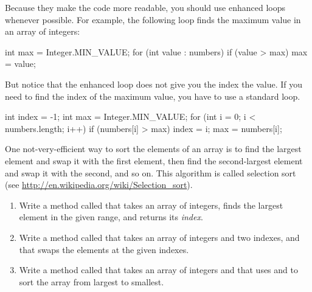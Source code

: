 
Because they make the code more readable, you should use enhanced  loops whenever possible.
For example, the following loop finds the maximum value in an array of integers:

\begin{code}
int max = Integer.MIN_VALUE;
for (int value : numbers) {
    if (value > max) {
        max = value;
    }
}
\end{code}

But notice that the enhanced  loop does not give you the index the value.
If you need to find the index of the maximum value, you have to use a standard  loop.

\begin{code}
int index = -1;
int max = Integer.MIN_VALUE;
for (int i = 0; i < numbers.length; i++) {
    if (numbers[i] > max) {
        index = i;
        max = numbers[i];
    }
}
\end{code}


\begin{exercise}
One not-very-efficient way to sort the elements of an array is to find the largest element and swap it with the first element, then find the second-largest element and swap it with the second, and so on.
This algorithm is called selection sort (see \url{http://en.wikipedia.org/wiki/Selection_sort}).

\begin{enumerate}

\item Write a method called  that takes an array of integers, finds the largest element in the given range, and returns its {\em index}.

\item Write a method called  that takes an array of integers and two indexes, and that swaps the elements at the given indexes.

\item Write a method called  that takes an array of integers and that uses  and  to sort the array from largest to smallest.

\end{enumerate}

\end{exercise}


